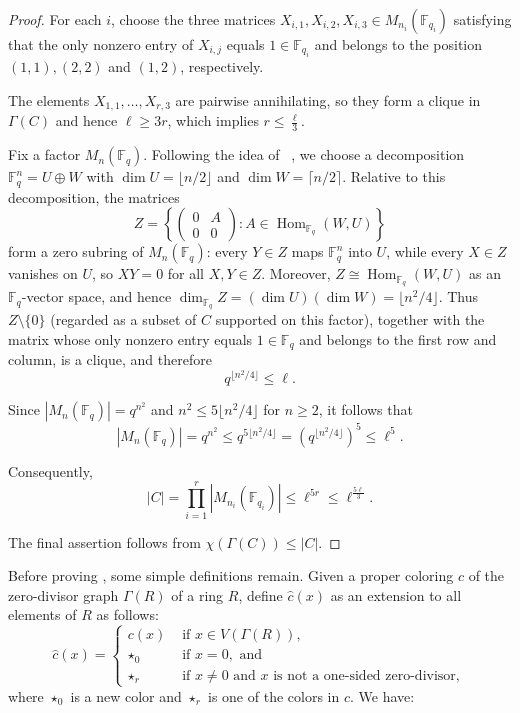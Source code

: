 \documentclass[a4paper,11pt]{amsart}
\theoremstyle{definition}
\newcommand{\F}{\mathbb F}
\begin{document}
\begin{proof}

For each $i$, choose the three matrices $X_{i,1}, X_{i,2}, X_{i,3}\in M_{n_i}(\F_{q_i})$ satisfying that the only nonzero entry of $X_{i,j}$ equals $1\in \F_{q_i}$ and belongs to the position $(1,1), (2,2)$ and $(1,2)$, respectively. 


The elements $X_{1,1},\ldots,X_{r,3}$ are pairwise
annihilating, so they form a clique in $\Gamma(C)$ and hence $\ell\geq 3r$, which implies $r\le\frac{\ell}{3}$. 

Fix a factor $M_n(\mathbb F_q)$. Following the idea of ~\cite[Theorem 8]{AM07}, we choose a decomposition
$\mathbb F_q^n=U\oplus W$ with $\dim U=\lfloor n/2\rfloor$ and
$\dim W=\lceil n/2\rceil$. Relative to this decomposition, the matrices
\[
    Z=
    \left\{
    \begin{pmatrix}
        0&A\\
        0&0
    \end{pmatrix}
    :
    A\in\operatorname{Hom}_{\mathbb F_q}(W,U)
    \right\}
\]
form a zero subring of $M_n(\mathbb F_q)$: every $Y\in Z$ maps
$\mathbb F_q^n$ into $U$, while every $X\in Z$ vanishes on $U$, so $XY=0$
for all $X,Y\in Z$. Moreover,
$Z\cong\operatorname{Hom}_{\mathbb F_q}(W,U)$ as an $\mathbb F_q$-vector
space, and hence
$\dim_{\mathbb F_q}Z=(\dim U)(\dim W)=\lfloor n^2/4\rfloor$. Thus
$Z\setminus\{0\}$ (regarded as a subset of $C$ supported on this factor), together with the matrix whose only nonzero entry equals $1\in\F_q$ and belongs to the first row and column, is
a clique, and therefore
\[
    q^{\lfloor n^2/4\rfloor}\le\ell.
\]


Since $|M_n(\mathbb F_q)|=q^{n^2}$ and
$n^2\le5\lfloor n^2/4\rfloor$ for $n\ge2$, it follows that
\[
    |M_n(\mathbb F_q)|
    =q^{n^2}
    \le q^{5\lfloor n^2/4\rfloor}
    =\left(q^{\lfloor n^2/4\rfloor}\right)^5
    \le\ell^5.
\]


Consequently,
\[
    |C|
    =\prod_{i=1}^r |M_{n_i}(\mathbb F_{q_i})|
    \le\ell^{5r}
    \le\ell^{\frac{5\ell}{3}}.
\]

The final assertion follows from $\chi(\Gamma(C))\le|C|$.
\end{proof}

Before proving , some simple definitions remain.
Given a proper coloring $c$ of the zero-divisor graph $\Gamma(R)$ of a ring $R$, define $\widehat c(x)$ as an extension to all elements of $R$ as follows:
\[
 \widehat c(x)=
 \begin{cases}
   c(x)& \text{ if } x\in V(\Gamma(R)),\\
   \star_0& \text{ if }x=0, \text{ and}\\
   \star_r&\text{ if }x\ne0\text{ and $x$ is not a one-sided zero-divisor},
 \end{cases}
\]
where $\star_0$ is a new color and $\star_r$ is one of the colors in $c$. We have:
\end{document}
